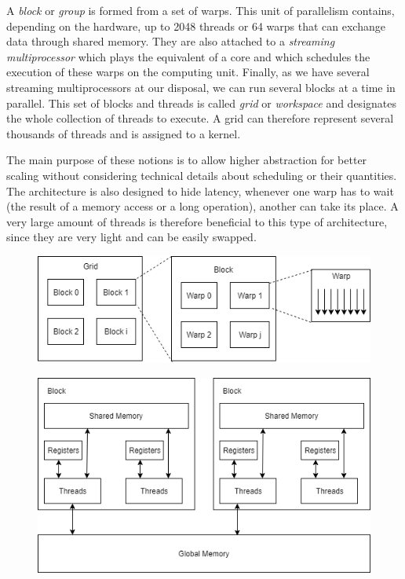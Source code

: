 A \textit{block} or \textit{group} is formed from a set of warps. This unit of parallelism contains, depending on the hardware, up to 2048 threads or 64 warps that can exchange data through shared memory. They are also attached to a \textit{streaming multiprocessor} which plays the equivalent of a core and which schedules the execution of these warps on the computing unit. Finally, as we have several streaming multiprocessors at our disposal, we can run several blocks at a time in parallel. This set of blocks and threads is called \textit{grid} or \textit{workspace} and designates the whole collection of threads to execute. A grid can therefore represent several thousands of threads and is assigned to a kernel.

The main purpose of these notions is to allow higher abstraction for better scaling without considering technical details about scheduling or their quantities. The architecture is also designed to hide latency, whenever one warp has to wait (the result of a memory access or a long operation), another can take its place. A very large amount of threads is therefore beneficial to this type of architecture, since they are very light and can be easily swapped.

\begin{figure}[!ht]
\centering
\begin{minipage}{.5\textwidth}
  \centering
  \includegraphics[width=0.9\linewidth]{Chapters/GPU/ThreadHierarchy.png}
  \label{fig:BSP}
\end{minipage}%
\begin{minipage}{.5\textwidth}
  \centering
  \includegraphics[width=0.9\linewidth]{Chapters/GPU/MemoryHierarchy.png}
  \label{fig:MapReduce}
\end{minipage}
\end{figure}


